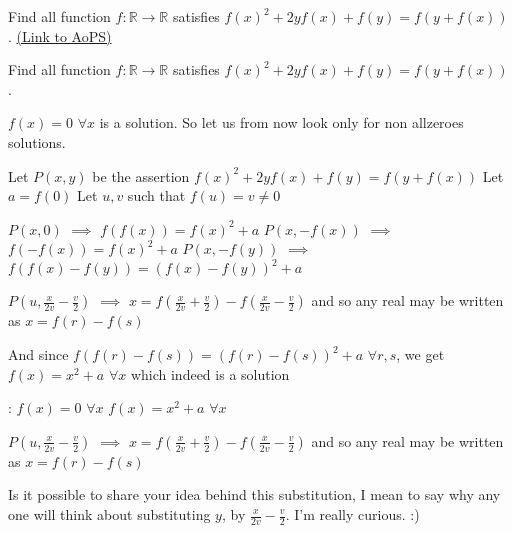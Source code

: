 \begin{problem}
	Find all function 
$ f:\mathbb{R}\rightarrow\mathbb{R} $ satisfies 
$ f(x)^2+2yf(x)+f(y)=f(y+f(x))$.
	\flushright \href{https://artofproblemsolving.com/community/c6h484393}{(Link to AoPS)}
\end{problem}



\begin{solution}
	\begin{tcolorbox}Find all function 
$ f:\mathbb{R}\rightarrow\mathbb{R} $ satisfies 
$ f(x)^2+2yf(x)+f(y)=f(y+f(x))$.\end{tcolorbox}
$f(x)=0$ $\forall x$ is a solution. So let us from now look only for non allzeroes solutions.

Let $P(x,y)$ be the assertion $f(x)^2+2yf(x)+f(y)=f(y+f(x))$
Let $a=f(0)$
Let $u,v$ such that $f(u)=v\ne 0$

$P(x,0)$ $\implies$ $f(f(x))=f(x)^2+a$
$P(x,-f(x))$ $\implies$ $f(-f(x))=f(x)^2+a$
$P(x,-f(y))$ $\implies$ $f(f(x)-f(y))=(f(x)-f(y))^2+a$

$P(u,\frac{x}{2v}-\frac v2)$ $\implies$ $x=f(\frac{x}{2v}+\frac v2)-f(\frac{x}{2v}-\frac v2)$ and so any real may be written as $x=f(r)-f(s)$

And since $f(f(r)-f(s))=(f(r)-f(s))^2+a$ $\forall r,s$, we get $f(x)=x^2+a$ $\forall x$ which indeed is a solution

 :
$f(x)=0$ $\forall x$
$f(x)=x^2+a$ $\forall x$
\end{solution}



\begin{solution}
	\begin{tcolorbox}
$P(u,\frac{x}{2v}-\frac v2)$ $\implies$ $x=f(\frac{x}{2v}+\frac v2)-f(\frac{x}{2v}-\frac v2)$ and so any real may be written as $x=f(r)-f(s)$

\end{tcolorbox}
Is it possible to share your idea behind this substitution, I mean to say why any one will think about substituting $y$, by $\frac{x}{2v}-\frac v2$.  I'm really curious. :)
\end{solution}



